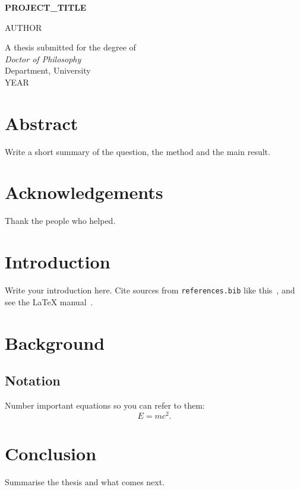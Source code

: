\documentclass[12pt,oneside]{report}
\begin{document}
\begin{titlepage}
  \centering
  {\LARGE\bfseries {{PROJECT_TITLE}}\par}
  \vspace{2cm}
  {\Large {{AUTHOR}}\par}
  \vfill
  A thesis submitted for the degree of\\
  \emph{Doctor of Philosophy}\\[1ex]
  Department, University\\[1ex]
  {{YEAR}}
\end{titlepage}

\chapter*{Abstract}
Write a short summary of the question, the method and the main result.

\chapter*{Acknowledgements}
Thank the people who helped.

\tableofcontents
\cleardoublepage
{}

\chapter{Introduction}
Write your introduction here. Cite sources from \texttt{references.bib} like
this~\cite{einstein1905}, and see the \LaTeX{} manual~\cite{lamport1994}.

\chapter{Background}
\section{Notation}
Number important equations so you can refer to them:
\begin{equation}
  E = mc^2 . \label{eq:energy}
\end{equation}

\chapter{Conclusion}
Summarise the thesis and what comes next.



\end{document}
